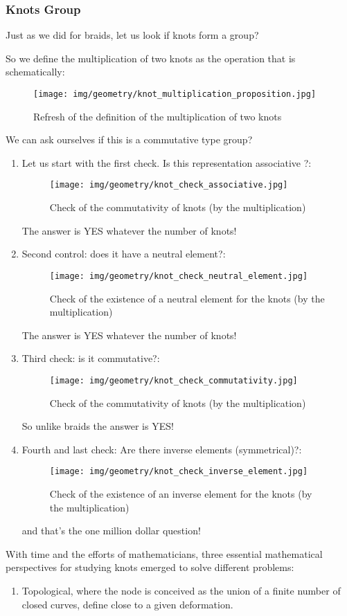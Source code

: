 {	\subsubsection{Knots Group}
	Just as we did for braids, let us look if knots form a group?
	
	So we define the multiplication of two knots as the operation that is schematically:
	\begin{figure}[H]
		\centering
		\texttt{[image: img/geometry/knot\_multiplication\_proposition.jpg]}
		\caption{Refresh of the definition of the multiplication of two knots}
	\end{figure}
	We can ask ourselves if this is a commutative type group?
	
	\begin{enumerate}
		\item Let us start with the first check. Is this representation associative ?:
		\begin{figure}[H]
			\centering
			\texttt{[image: img/geometry/knot\_check\_associative.jpg]}
			\caption{Check of the commutativity of knots (by the multiplication)}
		\end{figure}
		The answer is YES whatever the number of knots!
		
		\item Second control: does it have a neutral element?:
		\begin{figure}[H]
			\centering
			\texttt{[image: img/geometry/knot\_check\_neutral\_element.jpg]}
			\caption{Check of the existence of a neutral element for the knots (by the multiplication)}
		\end{figure}
		The answer is YES whatever the number of knots!
		
		\item Third check: is it commutative?:
		\begin{figure}[H]
			\centering
			\texttt{[image: img/geometry/knot\_check\_commutativity.jpg]}
			\caption{Check of the commutativity of knots (by the multiplication)}
		\end{figure}
		So unlike braids the answer is YES!
		
		\item Fourth and last check: Are there inverse elements (symmetrical)?:
		\begin{figure}[H]
			\centering
			\texttt{[image: img/geometry/knot\_check\_inverse\_element.jpg]}
			\caption{Check of the existence of an inverse element for the knots (by the multiplication)}
		\end{figure}
		and that's the one million dollar question!	
	\end{enumerate}
	With time and the efforts of mathematicians, three essential mathematical perspectives  for studying knots emerged to solve different problems:
	\begin{enumerate}
		\item Topological, where the node is conceived as the union of a finite number of closed curves, define close to a given deformation.
		

\end{enumerate}}

